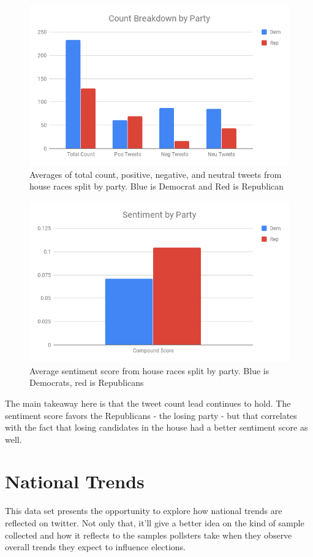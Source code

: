 \documentclass[11pt, twoside, reqno]{book}
\begin{document}
\begin{figure}[H]
\centering
	\includegraphics[scale=0.5]{count_party_house}
	\caption{Averages of total count, positive, negative, and neutral tweets from house races split by party. Blue is Democrat and Red is Republican}\label{fig:count_party_house}
\end{figure}

\begin{figure}[H]
\centering
	\includegraphics[scale=0.5]{party_sent_house}
	\caption{Average sentiment score from house races split by party. Blue is Democrats, red is Republicans}\label{fig:party_sent_house}
\end{figure}

The main takeaway here is that the tweet count lead continues to hold. The sentiment score favors the Republicans - the losing party - but that correlates with the fact that losing candidates in the house had a better sentiment score as well. 

\section{National Trends}
\hspace{0.2in} This data set presents the opportunity to explore how national trends are reflected on twitter. Not only that, it'll give a better idea on the kind of sample collected and how it reflects to the samples pollsters take when they observe overall trends they expect to influence elections. 
\end{document}
